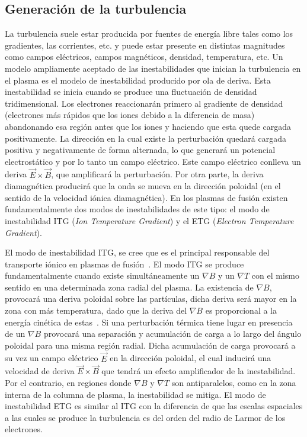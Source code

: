 \subsection{Generación de la turbulencia}\label{subsec:turbgen}
La turbulencia suele estar producida por fuentes de energía libre tales como los gradientes,
las corrientes, etc. y puede estar presente en distintas magnitudes como campos eléctricos,
campos magnéticos, densidad, temperatura, etc. 
Un modelo ampliamente aceptado de las inestabilidades que inician la turbulencia en el
plasma es el modelo de inestabilidad producido por ola de deriva. Esta inestabilidad se inicia 
cuando se produce
una fluctuación de densidad tridimensional. Los electrones
reaccionarán primero al gradiente de densidad (electrones más rápidos que los iones debido
a la diferencia de masa) abandonando esa región antes que los iones y haciendo que esta
quede cargada positivamente. La dirección en la cual existe la perturbación quedará cargada
positiva y negativamente de forma alternada, lo que generará un potencial electrostático y
por lo tanto un campo eléctrico. Este campo
eléctrico conlleva un deriva $\vec{E}\times\vec{B}$, 
que amplificará la perturbación. Por otra parte, la deriva
diamagnética producirá que la onda se mueva en la dirección poloidal (en el sentido de la
velocidad iónica diamagnética). 
En los plasmas de fusión existen fundamentalmente
dos modos de inestabilidades de este tipo: el modo de inestabilidad ITG (\textit{Ion Temperature
Gradient}) y el ETG (\textit{Electron Temperature Gradient}).\par
El modo de inestabilidad ITG, se cree que es el principal responsable del transporte iónico
en plasmas de fusión~\cite{Hamaguchi_1992,doi:10.1063/1.859860}. El modo ITG se produce fundamentalmente 
cuando existe
simultáneamente un $\nabla B$ y un $\nabla T$ con el mismo sentido en una determinada zona radial del
plasma. La existencia de $\nabla B$,
provocará una deriva poloidal sobre las partículas, dicha deriva será mayor en la zona con más
temperatura, dado que la deriva del $\nabla B$ es proporcional a la energía cinética de estas~\cite{goldston1995introduction}.
Si una perturbación térmica tiene lugar en presencia de un $\nabla B$ provocará una separación
y acumulación de carga a lo largo del ángulo poloidal para una misma región radial. 
Dicha acumulación de carga provocará a su vez un campo
eléctrico $\vec{E}$
en la dirección poloidal, el cual inducirá una velocidad de deriva $\vec{E}\times\vec{B}$ 
que tendrá un efecto amplificador de la inestabilidad.
Por el contrario, en regiones donde $\nabla B$ y $\nabla T$ son antiparalelos, como en la zona interna de
la columna de plasma, la inestabilidad se mitiga.
El modo de inestabilidad ETG es similar al ITG con la diferencia de que las escalas espaciales
a las cuales se produce la turbulencia es del orden del radio de Larmor de los electrones.
